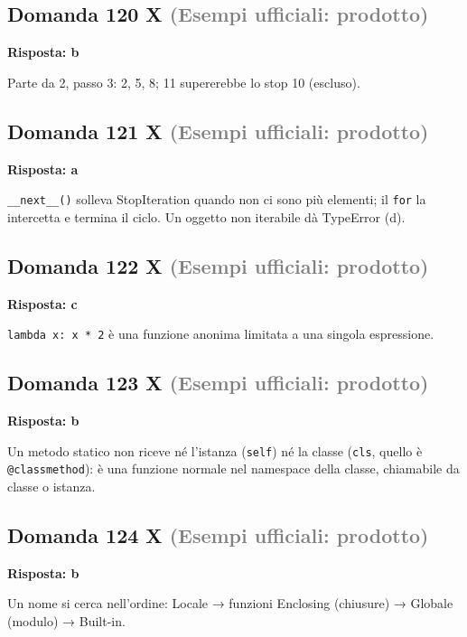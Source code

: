\documentclass[a4paper,11pt]{article}
\begin{document}
\subsection*{Domanda 120 X \hfill {\small \textcolor{gray}{(Esempi ufficiali: prodotto)}}}
\textbf{Risposta: b}\par
Parte da 2, passo 3: 2, 5, 8; 11 supererebbe lo stop 10 (escluso).



\subsection*{Domanda 121 X \hfill {\small \textcolor{gray}{(Esempi ufficiali: prodotto)}}}
\textbf{Risposta: a}\par
\texttt{\_\_next\_\_()} solleva StopIteration quando non ci sono più elementi; il \texttt{for} la intercetta e termina il ciclo. Un oggetto non iterabile dà TypeError (d).



\subsection*{Domanda 122 X \hfill {\small \textcolor{gray}{(Esempi ufficiali: prodotto)}}}
\textbf{Risposta: c}\par
\texttt{lambda x: x * 2} è una funzione anonima limitata a una singola espressione.



\subsection*{Domanda 123 X \hfill {\small \textcolor{gray}{(Esempi ufficiali: prodotto)}}}
\textbf{Risposta: b}\par
Un metodo statico non riceve né l'istanza (\texttt{self}) né la classe (\texttt{cls}, quello è \texttt{@classmethod}): è una funzione normale nel namespace della classe, chiamabile da classe o istanza.



\subsection*{Domanda 124 X \hfill {\small \textcolor{gray}{(Esempi ufficiali: prodotto)}}}
\textbf{Risposta: b}\par
Un nome si cerca nell'ordine: Locale → funzioni Enclosing (chiusure) → Globale (modulo) → Built-in.
\end{document}

